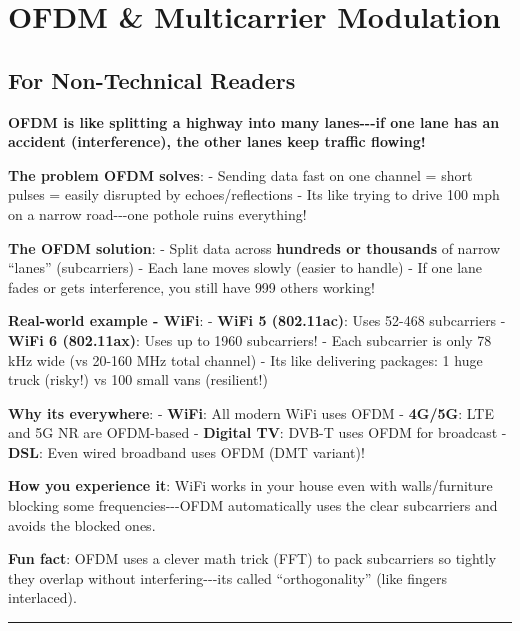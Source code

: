 \section{OFDM \& Multicarrier
Modulation}\label{ofdm-multicarrier-modulation}

\subsection{\texorpdfstring{ For Non-Technical
Readers}{ For Non-Technical Readers}}\label{for-non-technical-readers}

\textbf{OFDM is like splitting a highway into many lanes-\/-\/-if one
lane has an accident (interference), the other lanes keep traffic
flowing!}

\textbf{The problem OFDM solves}: - Sending data fast on one channel =
short pulses = easily disrupted by echoes/reflections -
It\textquotesingle s like trying to drive 100 mph on a narrow
road-\/-\/-one pothole ruins everything!

\textbf{The OFDM solution}: - Split data across \textbf{hundreds or
thousands} of narrow ``lanes'' (subcarriers) - Each lane moves slowly
(easier to handle) - If one lane fades or gets interference, you still
have 999 others working!

\textbf{Real-world example - WiFi}: - \textbf{WiFi 5 (802.11ac)}: Uses
52-468 subcarriers - \textbf{WiFi 6 (802.11ax)}: Uses up to 1960
subcarriers! - Each subcarrier is only 78 kHz wide (vs 20-160 MHz total
channel) - It\textquotesingle s like delivering packages: 1 huge truck
(risky!) vs 100 small vans (resilient!)

\textbf{Why it\textquotesingle s everywhere}: - \textbf{WiFi}: All
modern WiFi uses OFDM - \textbf{4G/5G}: LTE and 5G NR are OFDM-based -
\textbf{Digital TV}: DVB-T uses OFDM for broadcast - \textbf{DSL}: Even
wired broadband uses OFDM (DMT variant)!

\textbf{How you experience it}: WiFi works in your house even with
walls/furniture blocking some frequencies-\/-\/-OFDM automatically uses
the clear subcarriers and avoids the blocked ones.

\textbf{Fun fact}: OFDM uses a clever math trick (FFT) to pack
subcarriers so tightly they overlap without
interfering-\/-\/-it\textquotesingle s called ``orthogonality'' (like
fingers interlaced).

\begin{center}\rule{0.5\linewidth}{0.5pt}\end{center}

